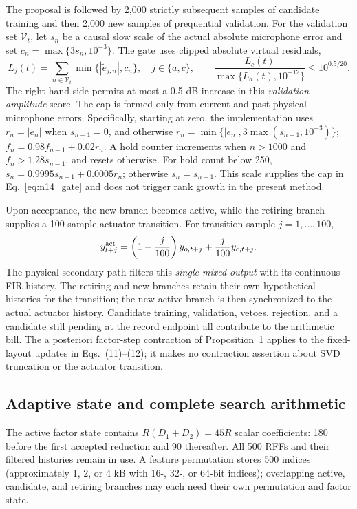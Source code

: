 The proposal is followed by 2{,}000 strictly subsequent samples of
candidate training and then 2{,}000 new samples of prequential validation.
For the validation set $\mathcal V_t$, let $s_n$ be a causal slow scale of
the actual absolute microphone error and set
$c_n=\max\{3s_n,10^{-3}\}$.  The gate uses clipped absolute virtual
residuals,
\begin{equation}
 L_j(t)=\sum_{n\in\mathcal V_t}
       \min\{|\widetilde e_{j,n}|,c_n\},
 \quad j\in\{a,c\},\qquad
 \frac{L_c(t)}{\max\{L_a(t),10^{-12}\}}
       \leq 10^{0.5/20}.
 \label{eq:n14_gate}
\end{equation}
The right-hand side permits at most a 0.5-dB increase in this
\emph{validation amplitude} score.  The cap is formed only from current
and past physical microphone errors.  Specifically, starting at zero,
the implementation uses
$r_n=|e_n|$ when $s_{n-1}=0$, and otherwise
$r_n=\min\{|e_n|,3\max(s_{n-1},10^{-3})\}$;
$f_n=0.98f_{n-1}+0.02r_n$.
A hold counter increments when
$n>1000$ and $f_n>1.28s_{n-1}$, and resets otherwise.
For hold count below 250,
$s_n=0.9995s_{n-1}+0.0005r_n$; otherwise
$s_n=s_{n-1}$.  This scale supplies the cap in Eq.~\eqref{eq:n14_gate}
and does not trigger rank growth in the present method.

Upon acceptance, the new branch becomes active, while the retiring
branch supplies a 100-sample actuator transition.  For transition sample
$j=1,\ldots,100$,
\begin{equation}
 y_{t+j}^{\rm act}
   =\left(1-\frac{j}{100}\right)y_{o,t+j}
       +\frac{j}{100}y_{c,t+j}.
 \label{eq:n14_ramp}
\end{equation}
The physical secondary path filters this \emph{single mixed output} with
its continuous FIR history.  The retiring and new branches retain their
own hypothetical histories for the transition; the new active branch is
then synchronized to the actual actuator history.  Candidate training,
validation, vetoes, rejection, and a candidate still pending at the record
endpoint all contribute to the arithmetic bill.  The a posteriori
factor-step contraction of Proposition~1 applies to the fixed-layout
updates in Eqs.~(11)--(12); it makes no contraction assertion about SVD
truncation or the actuator transition.

\subsection{Adaptive state and complete search arithmetic}
The active factor state contains $R(D_1+D_2)=45R$ scalar coefficients:
180 before the first accepted reduction and 90 thereafter.  All 500 RFFs
and their filtered histories remain in use.  A feature permutation stores
500 indices (approximately 1, 2, or 4 kB with 16-, 32-, or 64-bit indices);
overlapping active, candidate, and retiring branches may each need their
own permutation and factor state.

